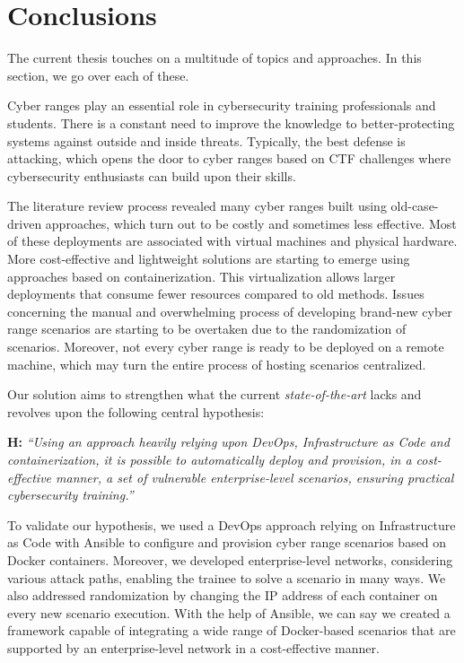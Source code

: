 \chapter{Conclusions}\label{chap:conclusion}

\minitoc

\hfill

The current thesis touches on a multitude of topics and approaches. In this section, we go over each of these.

Cyber ranges play an essential role in cybersecurity training professionals and students. There is a constant need to improve the knowledge to better-protecting systems against outside and inside threats. Typically, the best defense is attacking, which opens the door to cyber ranges based on CTF challenges where cybersecurity enthusiasts can build upon their skills.

The literature review process revealed many cyber ranges built using old-case-driven approaches, which turn out to be costly and sometimes less effective. Most of these deployments are associated with virtual machines and physical hardware. More cost-effective and lightweight solutions are starting to emerge using approaches based on containerization. This virtualization allows larger deployments that consume fewer resources compared to old methods. Issues concerning the manual and overwhelming process of developing brand-new cyber range scenarios are starting to be overtaken due to the randomization of scenarios. Moreover, not every cyber range is ready to be deployed on a remote machine, which may turn the entire process of hosting scenarios centralized.

Our solution aims to strengthen what the current \textit{state-of-the-art} lacks and revolves upon the following central hypothesis:\\

\leftskip=1.25cm\rightskip=1.25cm

\textbf{H:} \textit{``Using an approach heavily relying upon DevOps, Infrastructure as Code and containerization, it is possible to automatically deploy and provision, in a cost-effective manner, a set of vulnerable enterprise-level scenarios, ensuring practical cybersecurity training.''}\\

\leftskip=0cm\rightskip=0cm

To validate our hypothesis, we used a DevOps approach relying on Infrastructure as Code with Ansible to configure and provision cyber range scenarios based on Docker containers. Moreover, we developed enterprise-level networks, considering various attack paths, enabling the trainee to solve a scenario in many ways. We also addressed randomization by changing the IP address of each container on every new scenario execution. With the help of Ansible, we can say we created a framework capable of integrating a wide range of Docker-based scenarios that are supported by an enterprise-level network in a cost-effective manner.

